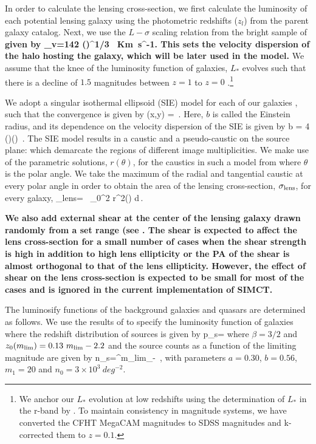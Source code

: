 \documentclass[useAMS,usenatbib,a4paper]{mn2e}
\begin{document}
In order to calculate the lensing cross-section, we first calculate the
luminosity of each potential lensing galaxy using the photometric redshifts
($z_l$) from the parent galaxy catalog. Next, we use the $L-\sigma$ scaling relation from the
bright sample of \citep{Parker2005} {\bf given by
\be
\label{magstar2}
\sigma_v=142 \left(\right)^{1/3} \, Km~s^{-1}.
\ee
This sets the velocity dispersion of the halo
hosting the galaxy, which will be later used in the model.}
We assume that the knee of the luminosity function of galaxies, $L_*$ evolves
such that there is a decline of $1.5$ magnitudes between $z=1$ to $z=0$
\citep{Faber2007}.\footnote{We anchor our $L_*$ evolution at low redshifts using the
determination of $L_*$ in the r-band by \citet{Blanton2001}. To maintain
consistency in magnitude systems, we have converted the CFHT MegaCAM magnitudes
to SDSS magnitudes and k-corrected them to $z=0.1$.}

We adopt a singular isothermal ellipsoid (SIE) model for each of our galaxies
\citep{Kormann1994}, such that the convergence is given by
\be
\kappa (x,y) =  \,.
\ee
Here, $b$ is called the Einstein radius, and its dependence on the velocity
dispersion of the SIE is given by
\be
b = 4\pi\,
\left(\right)\left(\right) \,.
\ee
The SIE model results in a caustic and a pseudo-caustic on the source
plane: which demarcate the regions of different image multiplicities. We
make use of the parametric solutions, $r(\theta)$, for the caustics in
such a model from \citet{Keeton2000b} where $\theta$ is the polar angle.
We take the maximum of the radial and tangential caustic at every polar
angle in order to obtain the area of the lensing cross-section,
$\sigma_{\rm lens}$, for every galaxy,
\be
\sigma_{\rm lens}= \, \int_0^{2\pi} r^2(\theta) d\theta \,.
\ee

{\bf We also add external shear at the center of the lensing galaxy
drawn randomly from a set range (see . The shear is
expected to affect the lens cross-section for a small number of cases
when the shear strength is high in addition to high lens ellipticity or
the PA of the shear is almost orthogonal to that of the lens
ellipticity. However, the effect of shear on the lens cross-section is
expected to be small for most of the cases and is ignored in the current
implementation of SIMCT.}

The luminosify functions of the background galaxies and quasars are
determined as follows. We use the results of \citet{Faure2009} to specify the luminosity
function of galaxies where the redshift distribution of sources is
given by
\be
\label{eqn:ps}
p_s=
\ee
where $\beta=3/2$ and $z_0(m_{\rm lim})=0.13~m_{\rm lim} - 2.2$ and the source
counts as a function of the limiting magnitude are given by
\be
\label{eqn:ns}
n_s=\int^{m_{\rm lim}}_{-\infty} 
\,,
\ee
with parameters $a=0.30$, $b=0.56$, $m_1=20$ and $n_0=3\times10^3~deg^{-2}$.
\end{document}
